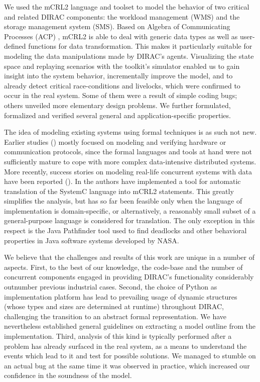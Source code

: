 \documentclass{IEEEtran}
\begin{document}
We used the mCRL2 language \cite{GMR+} and toolset \cite{Groote:08}
to model the behavior of two critical and related DIRAC components: the
workload management (WMS) and the storage management system (SMS). Based
on Algebra of Communicating Processes (ACP) \cite{BBR:09}, mCRL2 is able
to deal with generic data types as well as user-defined functions for
data transformation. This makes it particularly suitable for modeling
the data manipulations made by DIRAC's agents. Visualizing the state
space and replaying scenarios with the toolkit's simulator enabled us
to gain insight into the system behavior, incrementally improve the
model, and to already detect critical race-conditions and livelocks,
which were confirmed to occur in the real system. Some of them were a
result of simple coding bugs; others unveiled more elementary design
problems. We further formulated, formalized and verified several general
and application-specific properties.

The idea of modeling existing systems using
formal techniques is as such not new. Earlier studies
(\cite{HJ:04,Pa:06,Hol:90,Fok:11,BR:01,BFGPP:05,ISK:06}) mostly focused
on modeling and verifying hardware or communication protocols, since
the formal languages and tools at hand were not sufficiently mature
to cope with more complex data-intensive distributed systems. More
recently, success stories on modeling real-life concurrent systems with
data have been reported (\cite{HKW:11,BMU:09,HMS:11,VM:05,Plo:09}).
In \cite{HMS:11} the authors have implemented a tool for automatic
translation of the SystemC language into mCRL2 statements. This greatly
simplifies the analysis, but has so far been feasible only when the
language of implementation is domain-specific, or alternatively, a
reasonably small subset of a general-purpose language is considered for
translation. The only exception in this respect is the Java Pathfinder
tool \cite{VM:05} used to find deadlocks and other behavioral properties
in Java software systems developed by NASA.

We believe that the challenges and results of this work are unique in
a number of aspects. First, to the best of our knowledge, the code-base
and the number of concurrent components engaged in providing DIRAC’s
functionality considerably outnumber previous industrial cases. Second,
the choice of Python as implementation platform has lead to prevailing
usage of dynamic structures (whose types and sizes are determined at
runtime) throughout DIRAC, challenging the transition to an abstract
formal representation. We have nevertheless established general
guidelines on extracting a model outline from the implementation. Third,
analysis of this kind is typically performed after a problem has already
surfaced in the real system, as a means to understand the events which
lead to it and test for possible solutions. We managed to stumble on an
actual bug at the same time it was observed in practice, which increased
our confidence in the soundness of the model.
\end{document}
